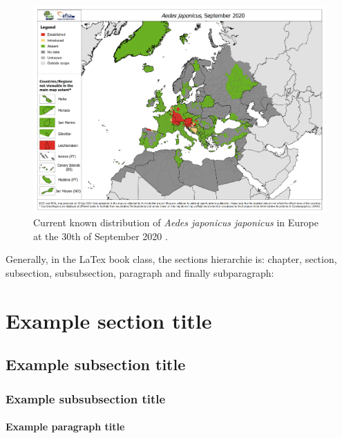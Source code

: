 \documentclass[%
a4paper,12pt,ngerman,UKenglish,twoside]{book}
\begin{document}
\begin{refsection}
\begin{figure}[!htb]
\centering
\includegraphics[width=\textwidth]{Intro_AedesJaponicusMap.pdf}
\caption[Current known distribution of \textit{Aedes japonicus japonicus} in Europe at the 30th of September 2020]{Current known distribution of \textit{Aedes japonicus japonicus} in Europe at the 30th of September 2020 \cite{ecdc_aedes_2020}.}
\label{fig:IntroJaponicusDistribution}
\end{figure}

Generally, in the LaTex book class, the sections hierarchie is: chapter, section, subsection, subsubsection, paragraph and finally subparagraph:

\section[Example short section title]{Example section title}\label{sec:example}
\subsection[Example short subsection title]{Example subsection title}
\subsubsection[Example short subsubsection title]{Example subsubsection title}
\paragraph{Example paragraph title}


\end{refsection}
\end{document}
